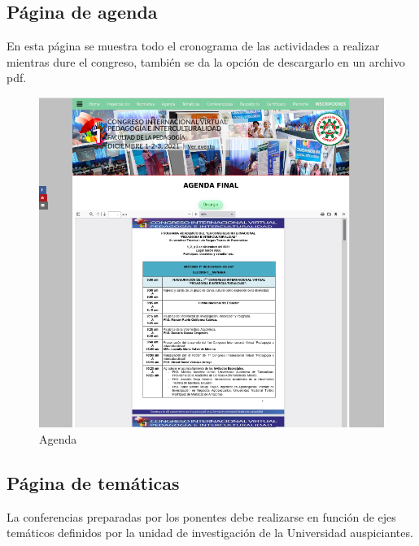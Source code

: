 \documentclass[a4paper,14px]{article}
\begin{document}
\subsection{Página de agenda }
\label{sec:pagina-principal}

En esta página se muestra todo el cronograma de las actividades a realizar mientras dure el congreso, también se da la opción de descargarlo en un archivo pdf.



\begin{figure}[H]
  \centering
  \includegraphics[scale=0.6]{agenda.png}
  \caption{Agenda}
  \label{fig:arquitectura}
\end{figure}


\newpage
\subsection{Página de temáticas }
\label{sec:pagina-principal}

La conferencias preparadas por los ponentes debe realizarse en función de ejes temáticos definidos por la unidad de investigación de la Universidad auspiciantes.
\end{document}
